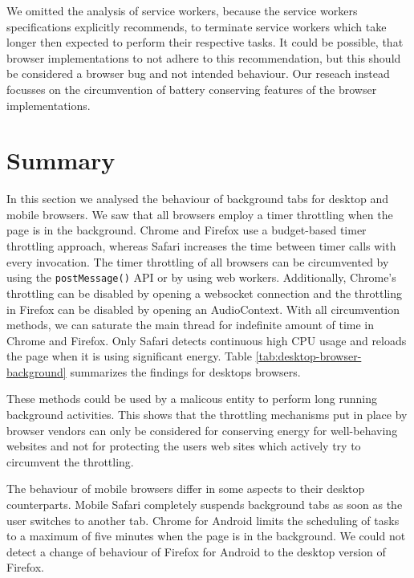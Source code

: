 \documentclass[
	ruledheaders=section,%
	class=report,%
	thesis={type=bachelor},%
	accentcolor=9c,%
	custommargins=true,%
	marginpar=false,%
	parskip=half-,%
	fontsize=11pt,%
]{tudapub}
\begin{document}
  We omitted the analysis of service workers, because the service workers specifications explicitly recommends, to terminate service workers which take longer then expected to perform their respective tasks. It could be possible, that browser implementations to not adhere to this recommendation, but this should be considered a browser bug and not intended behaviour. Our reseach instead focusses on the circumvention of battery conserving features of the browser implementations.


  
  \section{Summary}

  In this section we analysed the behaviour of background tabs for desktop and mobile browsers. We saw that all browsers employ a timer throttling when the page is in the background. Chrome and Firefox use a budget-based timer throttling approach, whereas Safari increases the time between timer calls with every invocation. The timer throttling of all browsers can be circumvented by using the \texttt{postMessage()} API or by using web workers. Additionally, Chrome's throttling can be disabled by opening a websocket connection and the throttling in Firefox can be disabled by opening an AudioContext. With all circumvention methods, we can saturate the main thread for indefinite amount of time in Chrome and Firefox. Only Safari detects continuous high CPU usage and reloads the page when it is using significant energy. Table \ref{tab:desktop-browser-background} summarizes the findings for desktops browsers.

  These methods could be used by a malicous entity to perform long running background activities. This shows that the throttling mechanisms put in place by browser vendors can only be considered for conserving energy for well-behaving websites and not for protecting the users web sites which actively try to circumvent the throttling.

  The behaviour of mobile browsers differ in some aspects to their desktop counterparts. Mobile Safari completely suspends background tabs as soon as the user switches to another tab. Chrome for Android limits the scheduling of tasks to a maximum of five minutes when the page is in the background. We could not detect a change of behaviour of Firefox for Android to the desktop version of Firefox.
\end{document}
